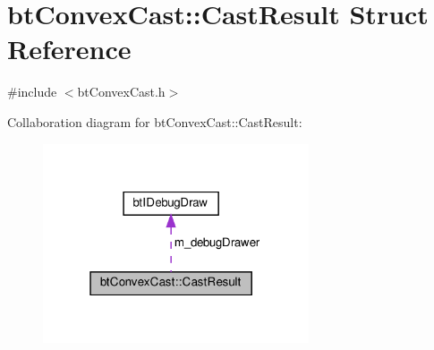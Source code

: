 \hypertarget{structbtConvexCast_1_1CastResult}{}\section{bt\+Convex\+Cast\+:\+:Cast\+Result Struct Reference}
\label{structbtConvexCast_1_1CastResult}


{\ttfamily \#include $<$bt\+Convex\+Cast.\+h$>$}



Collaboration diagram for bt\+Convex\+Cast\+:\+:Cast\+Result\+:
\nopagebreak
\begin{figure}[H]
\begin{center}
\leavevmode
\includegraphics[width=223pt]{structbtConvexCast_1_1CastResult__coll__graph}
\end{center}
\end{figure}
